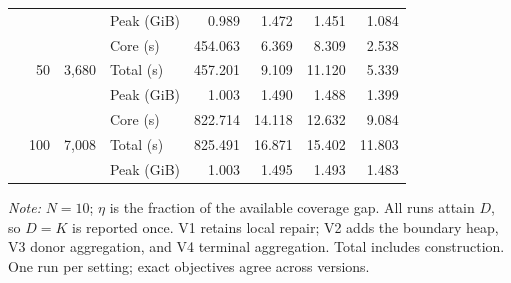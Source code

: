 \begin{table}[t]
\begin{tabular*}{\textwidth}{@{\extracolsep{\fill}}lrrlrrrr@{}}
 &  &  & Peak (GiB) & 0.989 & 1.472 & 1.451 & 1.084 \\
\addlinespace[1pt]
 & \multirow{3}{*}{50} & \multirow{3}{*}{3,680} & Core (s) & 454.063 & 6.369 & 8.309 & 2.538 \\
 &  &  & Total (s) & 457.201 & 9.109 & 11.120 & 5.339 \\
 &  &  & Peak (GiB) & 1.003 & 1.490 & 1.488 & 1.399 \\
\addlinespace[1pt]
 & \multirow{3}{*}{100} & \multirow{3}{*}{7,008} & Core (s) & 822.714 & 14.118 & 12.632 & 9.084 \\
 &  &  & Total (s) & 825.491 & 16.871 & 15.402 & 11.803 \\
 &  &  & Peak (GiB) & 1.003 & 1.495 & 1.493 & 1.483 \\
\bottomrule
\end{tabular*}
\par\smallskip
\begin{minipage}{.98\textwidth}\footnotesize
\textit{Note:} $N=10$; $\eta$ is the fraction of the available coverage gap. All runs attain $D$, so $D=K$ is reported once. V1 retains local repair; V2 adds the boundary heap, V3 donor aggregation, and V4 terminal aggregation. Total includes construction. One run per setting; exact objectives agree across versions.
\end{minipage}
\end{table}
